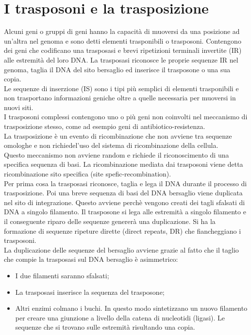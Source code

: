\section{I trasposoni e la trasposizione}
Alcuni geni o gruppi di geni hanno la capacità di muoversi da una posizione ad un'altra nel genoma e sono detti elementi trasponibili o trasposoni. Contengono dei geni che codificano una trasposasi e brevi ripetizioni terminali invertite (IR) alle estremità del loro DNA. La trasposasi riconosce le proprie sequenze IR nel genoma, taglia il DNA del sito bersaglio ed inserisce il trasposone o una sua copia. 
\\Le sequenze di inserzione (IS) sono i tipi più semplici di elementi trasponibili e non trasportano informazioni geniche oltre a quelle necessaria per muoversi in nuovi siti. 
\\I trasposoni complessi contengono uno o più geni non coinvolti nel meccanismo di trasposizione stesso, come ad esempio geni di antibiotico-resistenza.
\\La trasposizione è un evento di ricombinazione che non avviene tra sequenze omologhe e non richiedel'uso del sistema di ricombinazione della cellula. 
\\Questo meccanismo non avviene random e richiede il riconoscimento di una specifica sequenza di basi. La ricombinazione mediata dai trasposoni viene detta ricombinazione sito specifica (site spefic-recombination).  
\\Per prima cosa la trasposasi riconosce, taglia e lega il DNA durante il processo di trasposizione. Poi una breve sequenza di basi del DNA bersaglio viene duplicata nel sito di integrazione. Questo avviene perchè vengono creati dei tagli sfalsati di DNA a singolo filamento. Il trasposone si lega alle estremità a singolo filamento e il conseguente riparo delle sequenze genererà una duplicazione. Si ha la formazione di sequenze ripeture dirette (direct repeats, DR) che fiancheggiano i trasposoni. 
\\La duplicazione delle sequenze del bersaglio avviene grazie al fatto che il taglio che compie la trasposasi sul DNA bersaglio è asimmetrico:
\begin{itemize}
    \item I due filamenti saranno sfalsati;
    \item La trasposasi inserisce la sequenza del trasposone; 
    \item Altri enzimi colmano i buchi. In questo modo sintetizzano un nuovo filamento per creare una giunzione a livello della catena di nucleotidi (ligasi). Le sequenze che si trovano sulle estremità risultando una copia. 
\end{itemize}

